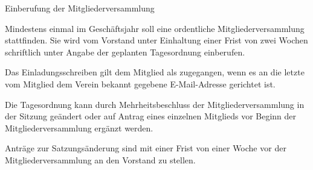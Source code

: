 \documentclass[11pt,a4paper,twoside,openany,article]{memoir}
\begin{document}
\begin{para}{Einberufung der Mitgliederversammlung}
	\label{p:mveinberufung}
	\item Mindestens einmal im Geschäftsjahr soll eine ordentliche Mitgliederversammlung stattfinden. Sie wird vom Vorstand unter Einhaltung einer Frist von zwei Wochen schriftlich unter Angabe der geplanten Tagesordnung einberufen.
	\item Das Einladungsschreiben gilt dem Mitglied als zugegangen, wenn es an die letzte vom Mitglied dem Verein bekannt gegebene E-Mail-Adresse gerichtet ist.
	\item Die Tagesordnung kann durch Mehrheitsbeschluss der Mitgliederversammlung in der Sitzung geändert oder auf Antrag eines einzelnen Mitglieds vor Beginn der Mitgliederversammlung ergänzt werden.
	\item Anträge zur Satzungsänderung sind mit einer Frist von einer Woche vor der Mitgliederversammlung an den Vorstand zu stellen.
\end{para}
\end{document}
